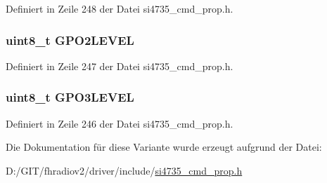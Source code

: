 Definiert in Zeile 248 der Datei si4735\+\_\+cmd\+\_\+prop.\+h.

\hypertarget{unionfm__gpio__set__arg1_a67701d7066b2ce7e0798b18633484091}{}
\subsubsection[{G\+P\+O2\+L\+E\+V\+E\+L}]{\setlength{\rightskip}{0pt plus 5cm}uint8\+\_\+t G\+P\+O2\+L\+E\+V\+E\+L}\label{unionfm__gpio__set__arg1_a67701d7066b2ce7e0798b18633484091}


Definiert in Zeile 247 der Datei si4735\+\_\+cmd\+\_\+prop.\+h.

\hypertarget{unionfm__gpio__set__arg1_af58ddf927d19d1bff07d6a0dd253d649}{}
\subsubsection[{G\+P\+O3\+L\+E\+V\+E\+L}]{\setlength{\rightskip}{0pt plus 5cm}uint8\+\_\+t G\+P\+O3\+L\+E\+V\+E\+L}\label{unionfm__gpio__set__arg1_af58ddf927d19d1bff07d6a0dd253d649}


Definiert in Zeile 246 der Datei si4735\+\_\+cmd\+\_\+prop.\+h.



Die Dokumentation für diese Variante wurde erzeugt aufgrund der Datei\+:\begin{DoxyCompactItemize}
\item 
D\+:/\+G\+I\+T/fhradiov2/driver/include/\hyperlink{si4735__cmd__prop_8h}{si4735\+\_\+cmd\+\_\+prop.\+h}\end{DoxyCompactItemize}
